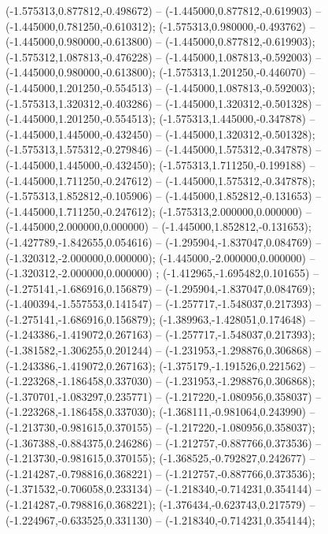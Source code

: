  (-1.575313,0.877812,-0.498672) -- (-1.445000,0.877812,-0.619903) -- (-1.445000,0.781250,-0.610312);
 (-1.575313,0.980000,-0.493762) -- (-1.445000,0.980000,-0.613800) -- (-1.445000,0.877812,-0.619903);
 (-1.575312,1.087813,-0.476228) -- (-1.445000,1.087813,-0.592003) -- (-1.445000,0.980000,-0.613800);
 (-1.575313,1.201250,-0.446070) -- (-1.445000,1.201250,-0.554513) -- (-1.445000,1.087813,-0.592003);
 (-1.575313,1.320312,-0.403286) -- (-1.445000,1.320312,-0.501328) -- (-1.445000,1.201250,-0.554513);
 (-1.575313,1.445000,-0.347878) -- (-1.445000,1.445000,-0.432450) -- (-1.445000,1.320312,-0.501328);
 (-1.575313,1.575312,-0.279846) -- (-1.445000,1.575312,-0.347878) -- (-1.445000,1.445000,-0.432450);
 (-1.575313,1.711250,-0.199188) -- (-1.445000,1.711250,-0.247612) -- (-1.445000,1.575312,-0.347878);
 (-1.575313,1.852812,-0.105906) -- (-1.445000,1.852812,-0.131653) -- (-1.445000,1.711250,-0.247612);
 (-1.575313,2.000000,0.000000) -- (-1.445000,2.000000,0.000000) -- (-1.445000,1.852812,-0.131653);
 (-1.427789,-1.842655,0.054616) -- (-1.295904,-1.837047,0.084769) -- (-1.320312,-2.000000,0.000000);
 (-1.445000,-2.000000,0.000000) -- (-1.320312,-2.000000,0.000000) ;
 (-1.412965,-1.695482,0.101655) -- (-1.275141,-1.686916,0.156879) -- (-1.295904,-1.837047,0.084769);
 (-1.400394,-1.557553,0.141547) -- (-1.257717,-1.548037,0.217393) -- (-1.275141,-1.686916,0.156879);
 (-1.389963,-1.428051,0.174648) -- (-1.243386,-1.419072,0.267163) -- (-1.257717,-1.548037,0.217393);
 (-1.381582,-1.306255,0.201244) -- (-1.231953,-1.298876,0.306868) -- (-1.243386,-1.419072,0.267163);
 (-1.375179,-1.191526,0.221562) -- (-1.223268,-1.186458,0.337030) -- (-1.231953,-1.298876,0.306868);
 (-1.370701,-1.083297,0.235771) -- (-1.217220,-1.080956,0.358037) -- (-1.223268,-1.186458,0.337030);
 (-1.368111,-0.981064,0.243990) -- (-1.213730,-0.981615,0.370155) -- (-1.217220,-1.080956,0.358037);
 (-1.367388,-0.884375,0.246286) -- (-1.212757,-0.887766,0.373536) -- (-1.213730,-0.981615,0.370155);
 (-1.368525,-0.792827,0.242677) -- (-1.214287,-0.798816,0.368221) -- (-1.212757,-0.887766,0.373536);
 (-1.371532,-0.706058,0.233134) -- (-1.218340,-0.714231,0.354144) -- (-1.214287,-0.798816,0.368221);
 (-1.376434,-0.623743,0.217579) -- (-1.224967,-0.633525,0.331130) -- (-1.218340,-0.714231,0.354144);
